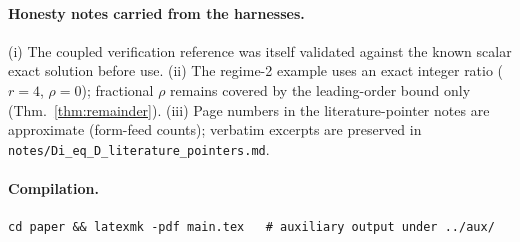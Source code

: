 \paragraph{Honesty notes carried from the harnesses.}
(i) The coupled verification reference was itself validated against the known
scalar exact solution before use. (ii) The regime-2 example uses an exact
integer ratio ($r=4$, $\rho=0$); fractional $\rho$ remains covered by the
leading-order bound only (Thm.~\ref{thm:remainder}). (iii) Page numbers in the
literature-pointer notes are approximate (form-feed counts); verbatim excerpts
are preserved in \texttt{notes/Di\_eq\_D\_literature\_pointers.md}.

\paragraph{Compilation.}
\begin{verbatim}
cd paper && latexmk -pdf main.tex   # auxiliary output under ../aux/
\end{verbatim}
